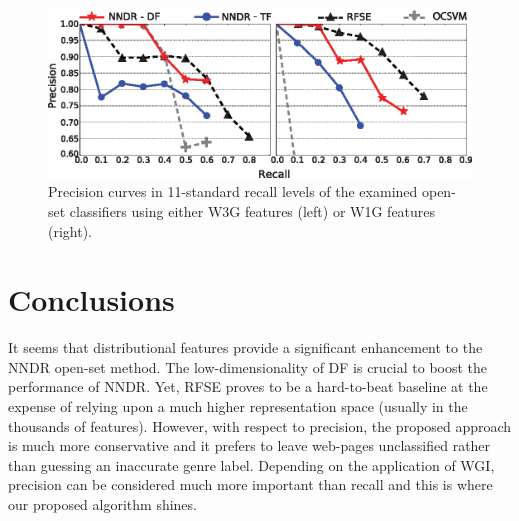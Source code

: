 \documentclass{llncs}
\begin{document}

\begin{figure}[t]
\begin{center}
    \includegraphics[scale=0.95]{NNDR_W3G-W1G_Best_RFSE-OCSVM-Baselines.eps}
	\caption{Precision curves in 11-standard recall levels of the examined open-set classifiers using either W3G features (left) or W1G features (right).}
	\label{fig:NNDR_W3G_Best_RFSE_Baseline}
	\end{center}
\vspace{-7mm}
\end{figure}


\section{Conclusions}\label{sec:conclusions}


It seems that distributional features provide a significant enhancement to the NNDR open-set method. The low-dimensionality of DF is crucial to boost the performance of NNDR. Yet, RFSE proves to be a hard-to-beat baseline at the expense of relying upon a much higher representation space (usually in the thousands of features). However, with respect to precision, the proposed approach is much more conservative and it prefers to leave web-pages unclassified rather than guessing an inaccurate genre label. Depending on the application of WGI, precision can be considered much more important than recall and this is where our proposed algorithm shines. 
\end{document}
